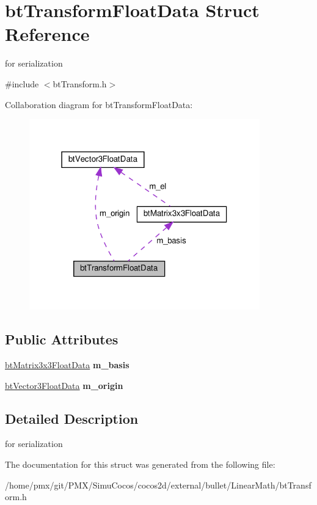 \hypertarget{structbtTransformFloatData}{}\section{bt\+Transform\+Float\+Data Struct Reference}
\label{structbtTransformFloatData}


for serialization  




{\ttfamily \#include $<$bt\+Transform.\+h$>$}



Collaboration diagram for bt\+Transform\+Float\+Data\+:
\nopagebreak
\begin{figure}[H]
\begin{center}
\leavevmode
\includegraphics[width=283pt]{structbtTransformFloatData__coll__graph}
\end{center}
\end{figure}
\subsection*{Public Attributes}
\begin{DoxyCompactItemize}
\item 
\mbox{\label{structbtTransformFloatData_a1f93fd962387f5ec48cf9da7df3846ad}} 
\hyperlink{structbtMatrix3x3FloatData}{bt\+Matrix3x3\+Float\+Data} {\bfseries m\+\_\+basis}
\item 
\mbox{\label{structbtTransformFloatData_abd1afa5a43625ee98a0129bc041cadfb}} 
\hyperlink{structbtVector3FloatData}{bt\+Vector3\+Float\+Data} {\bfseries m\+\_\+origin}
\end{DoxyCompactItemize}


\subsection{Detailed Description}
for serialization 

The documentation for this struct was generated from the following file\+:\begin{DoxyCompactItemize}
\item 
/home/pmx/git/\+P\+M\+X/\+Simu\+Cocos/cocos2d/external/bullet/\+Linear\+Math/bt\+Transform.\+h\end{DoxyCompactItemize}
